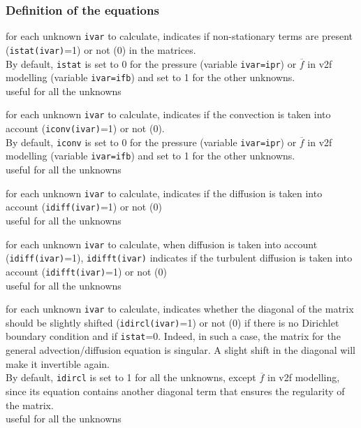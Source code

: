 \subsubsection{Definition of the equations}

{for each unknown {\tt ivar} to calculate, indicates if
non-stationary terms are present ({\tt istat(ivar)}=1) or not (0) in the matrices.\\
By default, {\tt istat} is set to 0 for the pressure (variable {\tt ivar=ipr})
or $\overline{f}$ in v2f modelling (variable {\tt ivar=ifb}) and set to
1 for the other unknowns.\\
useful for all the unknowns}

{for each unknown {\tt ivar} to calculate, indicates if the
convection is taken into account ({\tt iconv(ivar)}=1) or not (0).\\
By default, {\tt iconv} is set to 0 for the pressure (variable {\tt ivar=ipr})
or $\overline{f}$ in v2f modelling (variable {\tt ivar=ifb}) and set to
1 for the other unknowns.\\
useful for all the unknowns}

{for each unknown {\tt ivar} to calculate, indicates if the
diffusion is taken into account ({\tt idiff(ivar)}=1) or not (0)\\
useful for all the unknowns}

{for each unknown {\tt ivar} to calculate, when diffusion is taken
into account ({\tt idiff(ivar)}=1), {\tt idifft(ivar)} indicates if the turbulent
diffusion is taken into account ({\tt idifft(ivar)}=1) or not (0)\\
useful for all the unknowns }

{for each unknown {\tt ivar} to calculate, indicates whether the diagonal
of the matrix should be slightly shifted ({\tt idircl(ivar)}=1) or not (0) if there
is no Dirichlet boundary condition and if {\tt istat}=0. Indeed, in such a case,
the matrix for the general advection/diffusion equation is singular. A slight
shift in the diagonal will make it invertible again.\\
By default, {\tt idircl} is set to 1 for all the unknowns, except $\overline{f}$ in
v2f modelling, since its equation contains another diagonal term that ensures
the regularity of the matrix.\\
useful for all the unknowns}

